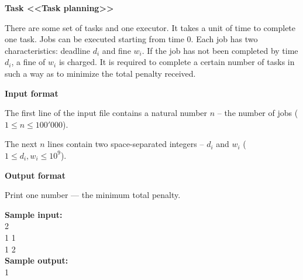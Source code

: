 \documentclass[a4paper]{article}
\begin{document}
\textbf{Task <<Task planning>>}

There are some set of tasks and one executor. It takes a unit of time to complete one task. Jobs can be executed starting from time $0$. Each job has two characteristics: deadline $d_i$ and fine $w_i$. If the job has not been completed by time $d_i$, a fine of $w_i$ is charged. It is required to complete a certain number of tasks in such a way as to minimize the total penalty received.

\SPACE

\textbf{Input format}

The first line of the input file contains a natural number $n$ -- the number of jobs ($1 \le n \le 100'000$).

The next $n$ lines contain two space-separated integers -- $d_i$ and $w_i$ ($1 \le d_i, w_i \le 10^9$).

\SPACE

\textbf{Output format}

Print one number — the minimum total penalty.

\LINE

\noindent \textbf{Sample input:}\\
2\\
1 1\\
1 2\\

\noindent \textbf{Sample output:}\\
1\\
\end{document}

